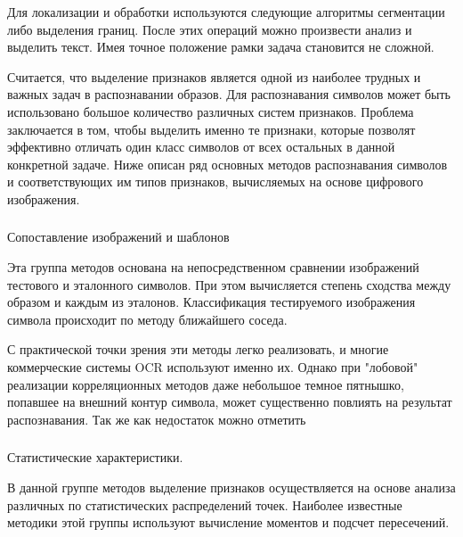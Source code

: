 Для локализации и обработки используются следующие алгоритмы сегментации либо выделения границ. После этих операций можно произвести анализ и выделить текст. Имея точное положение рамки задача становится не сложной.

Считается, что выделение признаков является одной из наиболее трудных и важных задач в распознавании образов. Для распознавания символов может быть использовано большое количество различных систем признаков. Проблема заключается в том, чтобы выделить именно те признаки, которые позволят эффективно отличать один класс символов от всех остальных в данной конкретной задаче.
Ниже описан ряд основных методов распознавания символов и соответствующих им типов признаков, вычисляемых на основе цифрового изображения.

\subsubsection{}
\label{sub:domain:recognition:compare_with_template}
Сопоставление изображений и шаблонов

Эта группа методов основана на непосредственном сравнении изображений тестового и эталонного символов. При этом вычисляется степень сходства между образом и каждым из эталонов. Классификация тестируемого изображения символа происходит по методу ближайшего соседа. 

С практической точки зрения эти методы легко реализовать, и многие коммерческие системы OCR используют именно их. Однако при "лобовой" реализации корреляционных методов даже небольшое темное пятнышко, попавшее на внешний контур символа, может существенно повлиять на результат распознавания. Так же как недостаток можно отметить

\subsubsection{}
\label{sub:domain:recognition:statistic_analisys}
Статистические характеристики.

В данной группе методов выделение признаков осуществляется на основе анализа различных по статистических распределений точек. Наиболее известные методики этой группы используют вычисление моментов и подсчет пересечений.

